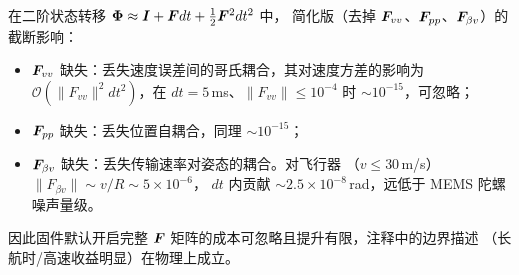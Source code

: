 在二阶状态转移 $\bm{\Phi} \approx \boldsymbol{I} + \boldsymbol{F}dt + \frac12\boldsymbol{F}^2dt^2$ 中，
简化版（去掉 $\boldsymbol{F}_{vv}$、$\boldsymbol{F}_{pp}$、$\boldsymbol{F}_{\beta v}$）的截断影响：
\begin{itemize}
  \item $\boldsymbol{F}_{vv}$ 缺失：丢失速度误差间的哥氏耦合，其对速度方差的影响为
    $\mathcal{O}(\|F_{vv}\|^2 dt^2)$，在 $dt=5$\,ms、$\|F_{vv}\|\le10^{-4}$
    时 $\sim10^{-15}$，可忽略；
  \item $\boldsymbol{F}_{pp}$ 缺失：丢失位置自耦合，同理 $\sim10^{-15}$；
  \item $\boldsymbol{F}_{\beta v}$ 缺失：丢失传输速率对姿态的耦合。对飞行器
    （$v \le 30$\,m/s）$\|F_{\beta v}\|\sim v/R \sim 5\times10^{-6}$，
    $dt$ 内贡献 $\sim2.5\times10^{-8}$\,rad，远低于 MEMS 陀螺噪声量级。
\end{itemize}
因此固件默认开启完整 $\boldsymbol{F}$ 矩阵的成本可忽略且提升有限，注释中的边界描述
（长航时/高速收益明显）在物理上成立。
